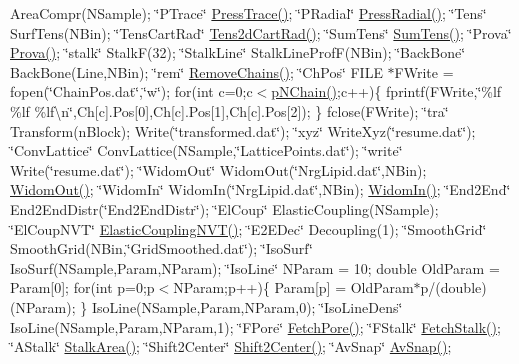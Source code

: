 Area\+Compr(\+N\+Sample); \char`\"{}\+P\+Trace\char`\"{} \hyperlink{classElPoly_a534f27d79203f0b018acaedf41bbdb13}{Press\+Trace()}; \char`\"{}\+P\+Radial\char`\"{} \hyperlink{classElPoly_a17a99c936b16e1880291e6c3c5957e44}{Press\+Radial()}; \char`\"{}\+Tens\char`\"{} Surf\+Tens(\+N\+Bin); \char`\"{}\+Tens\+Cart\+Rad\char`\"{} \hyperlink{classElPoly_a7282d2e3fe0a3ee0caa631363913cc0a}{Tens2d\+Cart\+Rad()}; \char`\"{}\+Sum\+Tens\char`\"{} \hyperlink{classElPoly_a35c812e3cfa8e0031dc2b521e075c1c9}{Sum\+Tens()}; \char`\"{}\+Prova\char`\"{} \hyperlink{classElPoly_a47cedfc639fa29b9812167b4fb5d1360}{Prova()}; \char`\"{}stalk\char`\"{} Stalk\+F(32); \char`\"{}\+Stalk\+Line\char`\"{} Stalk\+Line\+Prof\+F(\+N\+Bin); \char`\"{}\+Back\+Bone\char`\"{} Back\+Bone(\+Line,\+N\+Bin); \char`\"{}rem\char`\"{} \hyperlink{classElPoly_abfd537703af91a0dceb86c6bba5bd213}{Remove\+Chains()}; \char`\"{}\+Ch\+Pos\char`\"{} F\+I\+LE $\ast$\+F\+Write = fopen(\char`\"{}\+Chain\+Pos.\+dat\char`\"{},\char`\"{}w\char`\"{}); for(int c=0;c$<$\hyperlink{classVarData_a9f6d9339cabdd81a05bf272c116ceea2}{p\+N\+Chain()};c++)\{ fprintf(F\+Write,\char`\"{}\%lf \%lf \%lf\textbackslash{}n\char`\"{},Ch\mbox{[}c\mbox{]}.Pos\mbox{[}0\mbox{]},Ch\mbox{[}c\mbox{]}.Pos\mbox{[}1\mbox{]},Ch\mbox{[}c\mbox{]}.Pos\mbox{[}2\mbox{]}); \} fclose(\+F\+Write); \char`\"{}tra\char`\"{} Transform(n\+Block); Write(\char`\"{}transformed.\+dat\char`\"{}); \char`\"{}xyz\char`\"{} Write\+Xyz(\char`\"{}resume.\+dat\char`\"{}); \char`\"{}\+Conv\+Lattice\char`\"{} Conv\+Lattice(N\+Sample,\char`\"{}\+Lattice\+Points.\+dat\char`\"{}); \char`\"{}write\char`\"{} Write(\char`\"{}resume.\+dat\char`\"{}); \char`\"{}\+Widom\+Out\char`\"{} Widom\+Out(\char`\"{}\+Nrg\+Lipid.\+dat\char`\"{},N\+Bin); \hyperlink{classElPoly_ab6f6a1fc647dcd4684fcaa667d612099}{Widom\+Out()}; \char`\"{}\+Widom\+In\char`\"{} Widom\+In(\char`\"{}\+Nrg\+Lipid.\+dat\char`\"{},N\+Bin); \hyperlink{classElPoly_a2fbe8fbc91f83f0ac7a947965a3c38b8}{Widom\+In()}; \char`\"{}\+End2\+End\char`\"{} End2\+End\+Distr(\char`\"{}\+End2\+End\+Distr\char`\"{}); \char`\"{}\+El\+Coup\char`\"{} Elastic\+Coupling(\+N\+Sample); \char`\"{}\+El\+Coup\+N\+V\+T\char`\"{} \hyperlink{classElPoly_ab88192e9e4e0f11b68ad828d73ff8957}{Elastic\+Coupling\+N\+V\+T()}; \char`\"{}\+E2\+E\+Dec\char`\"{} Decoupling(1); \char`\"{}\+Smooth\+Grid\char`\"{} Smooth\+Grid(N\+Bin,\char`\"{}\+Grid\+Smoothed.\+dat\char`\"{}); \char`\"{}\+Iso\+Surf\char`\"{} Iso\+Surf(\+N\+Sample,\+Param,\+N\+Param); \char`\"{}\+Iso\+Line\char`\"{} N\+Param = 10; double Old\+Param = Param\mbox{[}0\mbox{]}; for(int p=0;p$<$N\+Param;p++)\{ Param\mbox{[}p\mbox{]} = Old\+Param$\ast$p/(double)(N\+Param); \} Iso\+Line(\+N\+Sample,\+Param,\+N\+Param,0); \char`\"{}\+Iso\+Line\+Dens\char`\"{} Iso\+Line(\+N\+Sample,\+Param,\+N\+Param,1); \char`\"{}\+F\+Pore\char`\"{} \hyperlink{classElPoly_aecd33584d71ae498798338253cbf83f0}{Fetch\+Pore()}; \char`\"{}\+F\+Stalk\char`\"{} \hyperlink{classElPoly_a21a28de0471580af1978c3a48ae0ba0e}{Fetch\+Stalk()}; \char`\"{}\+A\+Stalk\char`\"{} \hyperlink{classElPoly_a099625012512857cb5524bf15b397e5e}{Stalk\+Area()}; \char`\"{}\+Shift2\+Center\char`\"{} \hyperlink{classElPoly_a2d5b51a7f120a4104f6e5070ca6c55f5}{Shift2\+Center()}; \char`\"{}\+Av\+Snap\char`\"{} \hyperlink{classElPoly_aafe33ef0f28995ba7c1a778196decf9b}{Av\+Snap()}; 